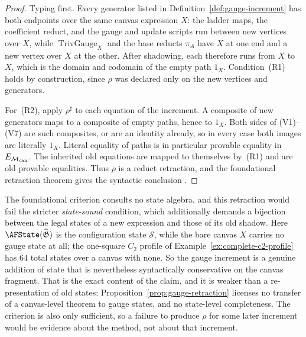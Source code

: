 \begin{proof}
Typing first.  Every generator listed in
Definition~\ref{def:gauge-increment} has both endpoints over the same canvas
expression $X$: the ladder maps, the coefficient reduct, and the gauge and
update scripts run between new vertices over $X$, while
$\operatorname{TrivGauge}_X$ and the base reducts $\pi_A$ have $X$ at one end
and a new vertex over $X$ at the other.  After shadowing, each therefore runs
from $X$ to $X$, which is the domain and codomain of the empty path $1_X$.
Condition~\textup{(R1)} holds by construction, since $\rho$ was declared only
on the new vertices and generators.

For~\textup{(R2)}, apply $\rho^\sharp$ to each equation of the increment.  A
composite of new generators maps to a composite of empty paths, hence to
$1_X$.  Both sides of (V1)--(V7) are such composites, or are an identity
already, so in every case both images are literally $1_X$.  Literal equality
of paths is in particular provable equality in $E_{\mathcal M_{\rm can}}$.  The
inherited old equations are mapped to themselves by~\textup{(R1)} and are old
provable equalities.  Thus $\rho$ is a reduct retraction, and the foundational
retraction theorem gives the syntactic conclusion \cite{ArtC}.
\end{proof}

\begin{remark}
\label{rem:not-state-sound}
The foundational criterion consults no state algebra, and this retraction
would fail the stricter \emph{state-sound} condition, which additionally
demands a bijection between the legal states of a new expression and those of
its old shadow.  Here $\AFState(\widehat{\mathfrak G})$ is the configuration
state $\mathcal S$, while the bare canvas $X$ carries no gauge state at all;
the one-square $C_2$ profile of
Example~\ref{ex:complete-c2-profile} has $64$ total states over a canvas with
none.  So the gauge increment is a genuine addition of state that is
nevertheless syntactically conservative on the canvas fragment.  That is the exact
content of the claim, and it is weaker than a re-presentation of old states:
Proposition~\ref{prop:gauge-retraction} licenses no transfer of a canvas-level
theorem to gauge states, and no state-level completeness.  The criterion is
also only sufficient, so a failure to produce $\rho$ for some later increment
would be evidence about the method, not about that increment.
\end{remark}

